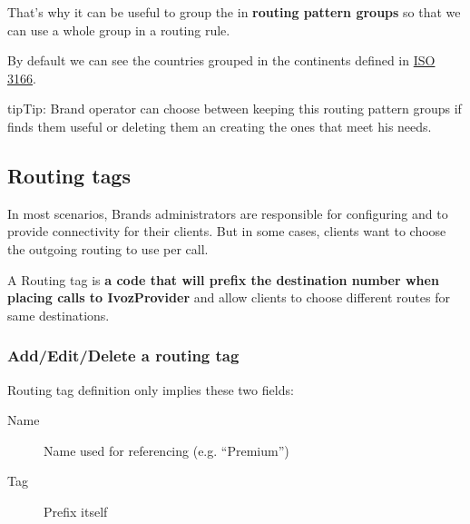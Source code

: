 \documentclass[letterpaper,10pt,english]{sphinxmanual}
\begin{document}
That's why it can be useful to group the {\hyperref[administration_portal/brand/routing/routing_patterns:routing\string-patterns]{}} in \textbf{routing pattern groups}
so that we can use a whole group in a routing rule.

By default we can see the countries grouped in the continents defined in
\href{https://en.wikipedia.org/wiki/ISO\_3166}{ISO 3166}.

\begin{notice}{tip}{Tip:}
Brand operator can choose between keeping this routing pattern groups if
finds them useful or deleting them an creating the ones that meet his needs.
\end{notice}


\subsection{Routing tags}
\label{administration_portal/brand/routing/routing_tags:routing-tags}\label{administration_portal/brand/routing/routing_tags::doc}
In most scenarios, Brands administrators are responsible for configuring
{\hyperref[administration_portal/brand/providers/carriers:carriers]{}} and {\hyperref[administration_portal/brand/routing/outgoing_routings:outgoing\string-routings]{}} to provide connectivity for
their clients. But in some cases, clients want to choose the outgoing routing to
use per call.

A Routing tag is \textbf{a code that will prefix the destination number when placing calls to IvozProvider} and allow clients
to choose different routes for same destinations.


\subsubsection{Add/Edit/Delete a routing tag}
\label{administration_portal/brand/routing/routing_tags:add-edit-delete-a-routing-tag}
Routing tag definition only implies these two fields:
\begin{description}
\item[{Name}] \leavevmode{}\label{administration_portal/brand/routing/routing_tags:term-name}
Name used for referencing (e.g. ``Premium'')

\item[{Tag}] \leavevmode{}\label{administration_portal/brand/routing/routing_tags:term-tag}
Prefix itself

\end{description}
\end{document}
